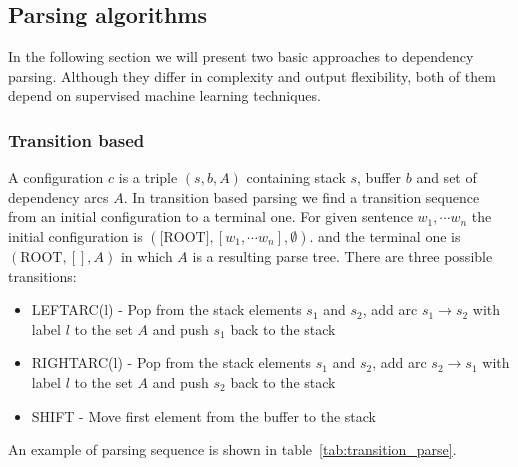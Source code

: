 \subsection{Parsing algorithms}
In the following section we will present two basic approaches to dependency parsing.
Although they differ in complexity and output flexibility, both of them depend
on supervised machine learning techniques.

\subsubsection{Transition based}
A configuration $c$ is a triple $(s, b, A)$ containing stack $s$,
buffer $b$ and set of dependency arcs $A$.
In transition based parsing we find a transition sequence from an initial configuration
to a terminal one.  For given sentence $w_1, \cdots w_n$
the initial configuration is $(\text{[ROOT]}, [w_1, \cdots w_n], \emptyset)$.
and the terminal one is $(\text{ROOT}, [], A)$ in which $A$ is a resulting parse tree.
There are three possible transitions:
\begin{itemize}
    \item {\ttfamily LEFTARC(l)} - Pop from the stack elements $s_1$ and $s_2$,
        add arc $s_1 \rightarrow s_2$ with label $l$ to the set $A$ and push $s_1$ back
        to the stack
    \item {\ttfamily RIGHTARC(l)} - Pop from the stack elements $s_1$ and $s_2$,
        add arc $s_2 \rightarrow s_1$ with label $l$ to the set $A$ and push $s_2$ back
        to the stack
    \item {\ttfamily SHIFT} - Move first element from the buffer to the stack
\end{itemize}
An example of parsing sequence is shown in table~\ref{tab:transition_parse}.
